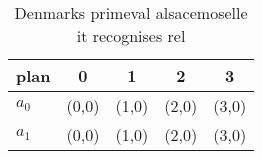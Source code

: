 \documentclass[a4paper]{article}
\begin{document}
\begin{table}
\begin{adjustbox}{width=0.7\columnwidth}
\begin{tabular}{|l|l|l|l|l|}
\hline
\textbf{plan} & \multicolumn{1}{c|}{\textbf{0}} & \multicolumn{1}{c|}{\textbf{1}} & \multicolumn{1}{c|}{\textbf{2}} & \multicolumn{1}{c|}{\textbf{3}} \\ \hline
\textbf{$a_0$}  & (0,0) & (1,0) & (2,0) & (3,0) \\ \hline
\textbf{$a_1$}  & (0,0) & (1,0) & (2,0) & (3,0) \\ \hline
\end{tabular}
\end{adjustbox}
\caption{Denmarks primeval alsacemoselle it recognises rel
}
\end{table}
\end{document}
